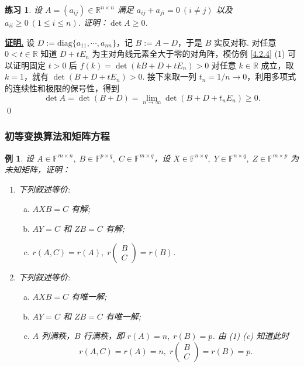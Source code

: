 \documentclass[10pt,openany]{article}
\theoremstyle{thmstyle} %
\newtheorem{practice}{练习}[section]
\theoremstyle{defstyle} %
\theoremstyle{prostyle} %
\theoremstyle{exastyle}
\newtheorem{example}[theorem]{例}
\theoremstyle{remstyle}
\renewenvironment{proof}[1][证明]{\par\underline{\textbf{#1.}} \;\fangsong}{\qed\par}
\newcommand{\F}{\mathbb{F}}
\newcommand{\R}{\mathbb{R}}
\newcommand{\n}{^{n \times n}}
\newcommand{\diag}{\mathrm{diag}}
\begin{document}
\begin{practice}
	设 \( A=(a_{ij}) \in \R\n \) 满足 \( a_{ij}+a_{ji}=0 \ (i \neq j) \) 以及 \( a_{ii} \geq 0 \ (1 \leq i \leq n) \). 证明：\( \det A \geq 0 \).
\end{practice}

\begin{proof}
   设 \( D:=\diag\{a_{11},\cdots,a_{nn} \} \)，记 \( B:=A-D \)，于是 \( B \) 实反对称. 对任意 \( 0<t \in \R \) 知道 \( D+tE_n \) 为主对角线元素全大于零的对角阵，模仿例 \ref{4.2.4} (1) 可以证明固定 \(t>0 \) 后 \( f(k)=\det(kB+D+tE_n)>0 \) 对任意 \( k \in \R \) 成立，取 \( k=1 \)，就有 \( \det(B+D+tE_n)>0 \). 接下来取一列 \( t_n=1/n \to 0 \)，利用多项式的连续性和极限的保号性，得到
   \[ \det A= \det(B+D)= \lim\limits_{n \to \infty} \det(B+D+t_nE_n) \geq 0. \]
\end{proof}

\subsubsection{初等变换算法和矩阵方程}

\begin{example}
	设 \( A \in \F^{m \times n}, \; B \in \F^{p \times q}, \; C \in \F^{m \times q} \)，设 \( X \in \F^{n \times q}, \; Y \in \F^{n \times q}, \; Z \in \F^{m \times p} \) 为未知矩阵，证明：
	\begin{enumerate}[(1)]
		\item 下列叙述等价:
		\begin{enumerate}[(a)]
			\item \( AXB=C \) 有解;
			\item \( AY=C \) 和 \( ZB=C \) 有解;
			\item \( r(A,C)=r(A), \; r\begin{pmatrix}
				B \\ C
			\end{pmatrix}=r(B) \).
		\end{enumerate} 
		\item 下列叙述等价:
		\begin{enumerate}[(a)]
			\item \( AXB=C \) 有唯一解;
			\item \( AY=C \) 和 \( ZB=C \) 有唯一解;
			\item \( A \) 列满秩，\( B \) 行满秩，即 \( r(A)=n, \; r(B)=p \). 由 (1) (c) 知道此时
			\[ r(A,C)=r(A)=n, \; r\begin{pmatrix}
				B \\ C
			\end{pmatrix}=r(B)=p.\]
		\end{enumerate}
	\end{enumerate}
\end{example}
\end{document}

